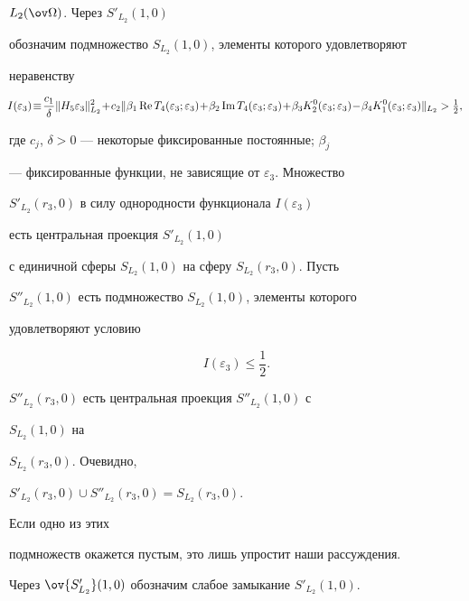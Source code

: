 $L_2(\ov\Omega)$. Через $S'_{L_2}(1,0)$ 


обозначим подмножество $S_{L_2}(1,0)$, элементы которого удовлетворяют 


неравенству 


\begin{equation} 


\negthickspace


I(\varepsilon_3)\!\equiv\!\frac{c_1}{\delta} 


\|H_5\varepsilon_3\|^2_{L_2}\!+\!c_2\|\beta_1\re T_4 


(\varepsilon_3;\varepsilon_3)\!+\!\beta_2\im T_4 


(\varepsilon_3;\varepsilon_3)\!+\!\beta_3 K^0_2 


(\varepsilon_3;\varepsilon_3)\!-\!\beta_4 K^0_1 


(\varepsilon_3;\varepsilon_3)\|_{L_2}>\tfrac{1}{2}, 


\end{equation} 


где $c_j$, $\delta>0$ --- некоторые фиксированные постоянные; $\beta_j$ 


--- фиксированные функции, не зависящие от $\varepsilon_3$. Множество 


$S'_{L_2}(r_3,0)$ в силу однородности функционала $I(\varepsilon_3)$ 


есть центральная проекция $S'_{L_2}(1,0)$ 


с единичной сферы $S_{L_2}(1,0)$ на сферу $S_{L_2}(r_3,0)$. Пусть 


$S''_{L_2}(1,0)$ есть подмножество $S_{L_2}(1,0)$, элементы которого 


удовлетворяют условию 


\begin{equation} 


I(\varepsilon_3)\le\frac{1}{2}. 


\end{equation} 


$S''_{L_2}(r_3,0)$ есть центральная проекция $S''_{L_2}(1,0)$ с 


$S_{L_2}(1,0)$ на 


$S_{L_2}(r_3,0)$. Очевидно, 


$S'_{L_2}(r_3,0)\cup S''_{L_2}(r_3,0)=S_{L_2}(r_3,0)$. 


Если одно из этих 


подмножеств окажется пустым, это лишь упростит наши рассуждения. 


Через $\ov{S'_{L_2}}(1,0)$ обозначим слабое замыкание $S'_{L_2}(1,0)$. 


